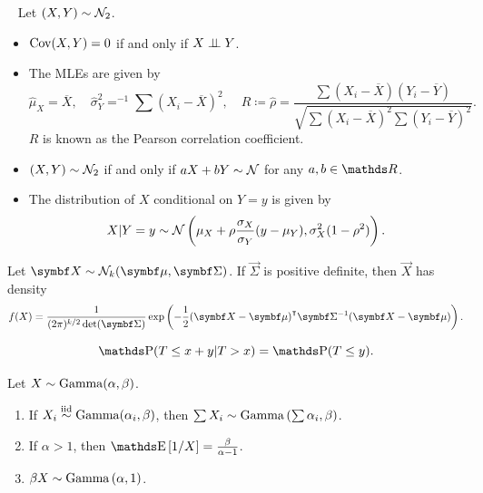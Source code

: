 \begin{proposition}~
  Let \((X, Y) \sim \mathcal{N}_2\).
  \begin{itemize}
    \item \(\operatorname{Cov}(X, Y) = 0\) if and only if \(X \perp \!\!\! \perp Y\).
    \item The MLEs are given by
      \[
        \hat{\mu}_X = \overline{X}, \quad
        \hat{\sigma}_Y^2 = ^{-1} \sum (X_i - \overline{X})^2, \quad
        R
        \coloneqq \hat{\rho}
        = \frac{\sum (X_i - \overline{X}) (Y_i - \overline{Y})}{\sqrt{\sum (X_i - \overline{X})^2 \sum (Y_i - \overline{Y})^2}}.
      \]
      \(R\) is known as the Pearson correlation coefficient.
    \item \((X, Y) \sim \mathcal{N}_2\) if and only if \(aX + bY \sim \mathcal{N}\) for any \(a, b \in \RR\).
    \item The distribution of \(X\) conditional on \(Y = y\) is given by
      \[
        X | Y = y
        \sim \mathcal{N}\left(\mu_X + \rho \frac{\sigma_X}{\sigma_Y} (y - \mu_Y), \sigma_X^2 (1 - \rho^2)\right).
      \]
  \end{itemize}
  Let \(\vec{X} \sim \Normal_k(\vec{\mu}, \vec{\Sigma})\).
  If \(\vec{\Sigma}\) is positive definite, then \(\vec{X}\) has density 
  \[
    f(X) = \frac{1}{(2\pi)^{k / 2} \det(\vec{\Sigma})} \exp \left( -\frac{1}{2} (\vec{X} - \vec{\mu})^\T \vec{\Sigma}^{-1} (\vec{X} - \vec{\mu}) \right).
  \]
\end{proposition}

\begin{proposition}
  \[
    \P(T \leq x + y | T > x) = \P(T \leq y).
  \]
\end{proposition}

\begin{proposition}
  Let \(X \sim \operatorname{Gamma}(\alpha, \beta)\).
  \begin{enumerate}[label=(\roman*)]
    \item %
      If \(X_i \overset{\mathrm{iid}}{\sim} \operatorname{Gamma}(\alpha_i, \beta)\), then 
      \(\sum X_i \sim \operatorname{Gamma}\left( \sum \alpha_i, \beta \right)\). 
    \item %
      If \(\alpha > 1\), then 
      \(\E\left[ 1 / X \right] = \frac{\beta}{\alpha - 1}\). 
    \item \(\beta X \sim \operatorname{Gamma}\left( \alpha, 1 \right)\). 
  \end{enumerate}
\end{proposition}
